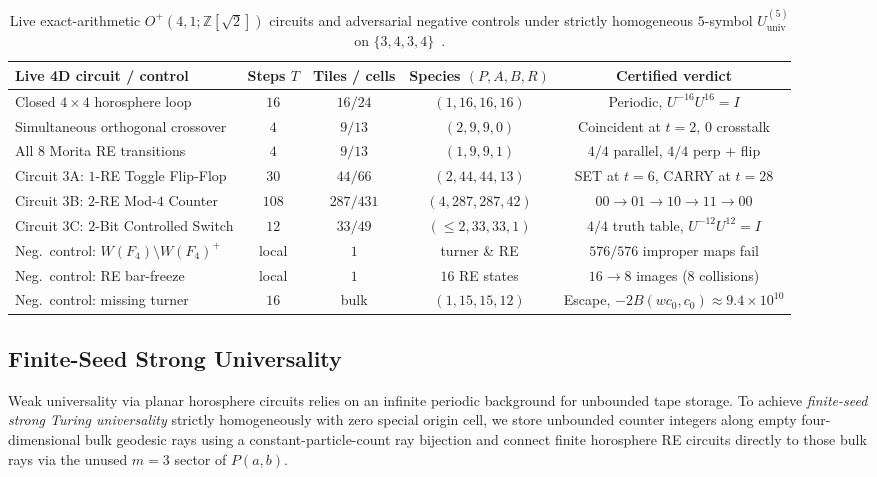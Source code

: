 \begin{table}[tb]
\centering
\caption{Live exact-arithmetic $O^+(4,1;\mathbb{Z}[\sqrt{2}])$ circuits and adversarial negative controls under strictly homogeneous $5$-symbol $U_{\mathrm{univ}}^{(5)}$ on $\{3,4,3,4\}$~\cite{pollard2026repo}.}
\label{tab:homog-circuits}
\footnotesize
\setlength{\tabcolsep}{3pt}
\begin{tabular}{@{}lcccc@{}}
\toprule
Live 4D circuit / control & Steps $T$ & Tiles / cells & Species $(P,A,B,R)$ & Certified verdict \\
\midrule
Closed $4 \times 4$ horosphere loop & $16$ & $16 / 24$ & $(1, 16, 16, 16)$ & Periodic, $U^{-16} U^{16} = I$ \\
Simultaneous orthogonal crossover & $4$ & $9 / 13$ & $(2, 9, 9, 0)$ & Coincident at $t=2$, $0$ crosstalk \\
All $8$ Morita RE transitions & $4$ & $9 / 13$ & $(1, 9, 9, 1)$ & $4/4$ parallel, $4/4$ perp + flip \\
Circuit 3A: $1$-RE Toggle Flip-Flop & $30$ & $44 / 66$ & $(2, 44, 44, 13)$ & SET at $t=6$, CARRY at $t=28$ \\
Circuit 3B: $2$-RE Mod-$4$ Counter & $108$ & $287 / 431$ & $(4, 287, 287, 42)$ & $00 \!\to\! 01 \!\to\! 10 \!\to\! 11 \!\to\! 00$ \\
Circuit 3C: $2$-Bit Controlled Switch & $12$ & $33 / 49$ & $(\le 2, 33, 33, 1)$ & $4/4$ truth table, $U^{-12} U^{12} = I$ \\
Neg.\ control: $W(F_4) \setminus W(F_4)^+$ & local & $1$ & turner \& RE & $576/576$ improper maps fail \\
Neg.\ control: RE bar-freeze & local & $1$ & $16$ RE states & $16 \to 8$ images ($8$ collisions) \\
Neg.\ control: missing turner & $16$ & bulk & $(1, 15, 15, 12)$ & Escape, $-2B(wc_0,c_0) \approx 9.4 \times 10^{10}$ \\
\bottomrule
\end{tabular}
\end{table}

\subsection{Finite-Seed Strong Universality}
\label{subsec:counter-machine}

Weak universality via planar horosphere circuits relies on an infinite periodic background for unbounded tape storage. To achieve \emph{finite-seed strong Turing universality} strictly homogeneously with zero special origin cell, we store unbounded counter integers along empty four-dimensional bulk geodesic rays using a constant-particle-count ray bijection and connect finite horosphere RE circuits directly to those bulk rays via the unused $m = 3$ sector of $P(a,b)$.

